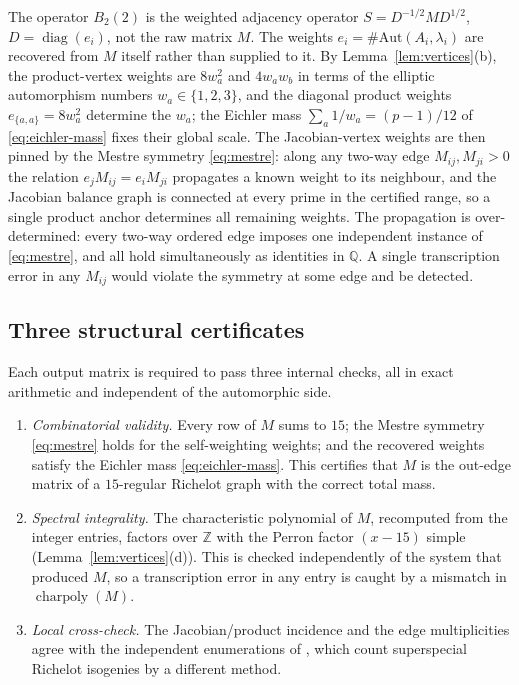\documentclass[10pt,a4paper]{amsart}
\newcommand{\Q}{\mathbb{Q}}
\newcommand{\Z}{\mathbb{Z}}
\newcommand{\Aut}{\mathrm{Aut}}
\DeclareMathOperator{\charp}{charpoly}
\DeclareMathOperator{\diag}{diag}
\providecommand{\charp}{\operatorname{charpoly}}
\begin{document}
	The operator $B_2(2)$ is the weighted adjacency operator
	$S=D^{-1/2}MD^{1/2}$, $D=\diag(e_i)$, not the raw matrix $M$. The weights
	$e_i=\#\Aut(A_i,\lambda_i)$ are recovered from $M$ itself rather than
	supplied to it. By Lemma~\ref{lem:vertices}(b), the product-vertex weights
	are $8w_a^2$ and $4w_aw_b$ in terms of the elliptic automorphism numbers
	$w_a\in\{1,2,3\}$, and the diagonal product weights $e_{\{a,a\}}=8w_a^2$
	determine the $w_a$; the Eichler mass $\sum_a1/w_a=(p-1)/12$ of
	\eqref{eq:eichler-mass} fixes their global scale. The Jacobian-vertex
	weights are then pinned by the Mestre symmetry \eqref{eq:mestre}: along
	any two-way edge $M_{ij},M_{ji}>0$ the relation $e_jM_{ij}=e_iM_{ji}$
	propagates a known weight to its neighbour, and the Jacobian balance graph
	is connected at every prime in the certified range, so a single product
	anchor determines all remaining weights. The propagation is
	over-determined: every two-way ordered edge imposes one independent
	instance of \eqref{eq:mestre}, and all hold simultaneously as identities
	in $\Q$. A single transcription error in any $M_{ij}$ would violate the
	symmetry at some edge and be detected.
	
	\subsection{Three structural certificates}
	\label{ss:pillars}
	
	Each output matrix is required to pass three internal checks, all in exact
	arithmetic and independent of the automorphic side.
	
	\begin{enumerate}[label=\textup{(P\arabic*)},leftmargin=2.6em]
		\item \emph{Combinatorial validity.} Every row of $M$ sums to $15$; the
		Mestre symmetry \eqref{eq:mestre} holds for the self-weighting weights;
		and the recovered weights satisfy the Eichler mass \eqref{eq:eichler-mass}.
		This certifies that $M$ is the out-edge matrix of a $15$-regular Richelot
		graph with the correct total mass.
		\item \emph{Spectral integrality.} The characteristic polynomial of $M$,
		recomputed from the integer entries, factors over $\Z$ with the Perron
		factor $(x-15)$ simple (Lemma~\ref{lem:vertices}(d)). This is checked
		independently of the system that produced $M$, so a transcription error in
		any entry is caught by a mismatch in $\charp(M)$.
		\item \emph{Local cross-check.} The Jacobian/product incidence and the
		edge multiplicities agree with the independent enumerations of
		\cite{KatsuraTakashima,FloritSmith}, which count superspecial Richelot
		isogenies by a different method.
	\end{enumerate}
	
\end{document}

